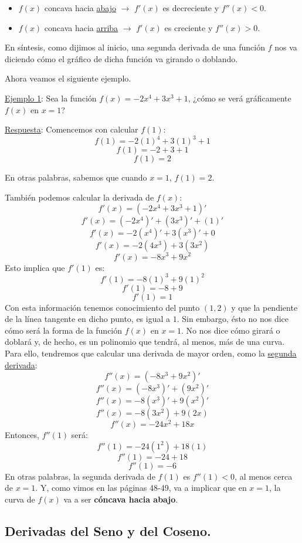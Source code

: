 \documentclass[12pt]{article}
\begin{document}
\begin{itemize}
\item $f(x)$ concava hacia \underline{abajo} $\rightarrow$ $f'(x)$ es decreciente y $f''(x) < 0$.
\item $f(x)$ concava hacia \underline{arriba} $\rightarrow$ $f'(x)$ es creciente y $f''(x) > 0$.
\end{itemize}

En síntesis, como dijimos al inicio, una segunda derivada de una función $f$ nos va diciendo cómo el gráfico de dicha función va girando o doblando.

Ahora veamos el siguiente ejemplo.

\underline{Ejemplo 1}: Sea la función $f(x) = -2x^{4} + 3x^{3} + 1$, ¿cómo se verá gráficamente $f(x)$ en $x = 1$?

\underline{Respuesta}: Comencemos con calcular $f(1)$:
\[f(1) = -2(1)^4 + 3(1)^3 + 1\]
\[f(1) = -2 + 3 + 1\]
\[f(1) = 2\]

En otras palabras, sabemos que cuando $x = 1$, $f(1) = 2$.

También podemos calcular la derivada de $f(x)$:
\[f'(x) = (-2x^{4} + 3x^{3} + 1)'\]
\[f'(x) = (-2x^{4})' + (3x^{3})' + (1)'\]
\[f'(x) = -2(x^{4})' + 3(x^{3})' + 0\]
\[f'(x) = -2(4x^{3}) + 3(3x^{2})\]
\[f'(x) = -8x^{3} + 9x^{2}\]
Esto implica que $f'(1)$ es:
\[f'(1) = -8(1)^{3} + 9(1)^{2}\]
\[f'(1) = -8 + 9\]
\[f'(1) = 1\]
Con esta información tenemos conocimiento del punto $(1, 2)$ y que la pendiente de la línea tangente en dicho punto, es igual a $1$. Sin embargo, ésto no nos dice cómo será la forma de la función $f(x)$ en $x = 1$. No nos dice cómo girará o doblará y, de hecho, es un polinomio que tendrá, al menos, más de una curva. Para ello, tendremos que calcular una derivada de mayor orden, como la \underline{segunda derivada}:
\[f''(x) = (-8x^{3} + 9x^{2})'\]
\[f''(x) = (-8x^{3})' + (9x^{2})'\]
\[f''(x) = -8(x^{3})' + 9(x^{2})'\]
\[f''(x) = -8(3x^{2}) + 9(2x)\]
\[f''(x) = -24x^{2} + 18x\]
Entonces, $f''(1)$ será:
\[f''(1) = -24(1^{2}) + 18(1)\]
\[f''(1) = -24 + 18\]
\[f''(1) = -6\]
En otras palabras, la segunda derivada de $f(1)$ es $f''(1) < 0$, al menos cerca de $x = 1$. Y, como vimos en las páginas 48-49, va a implicar que en $x = 1$, la curva de $f(x)$ va a ser \textbf{cóncava hacia abajo}.




\subsection{Derivadas del Seno y del Coseno.}
\end{document}
